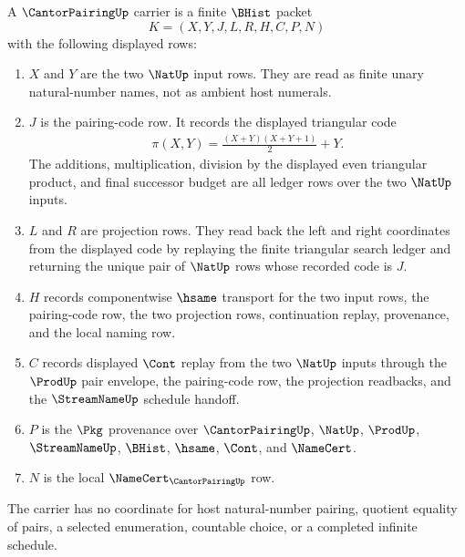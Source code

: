 \begin{definition}
\label{def:cantor-pairing-carrier}
A $\CantorPairingUp$ carrier is a finite $\BHist$ packet
$$
K=(X,Y,J,L,R,H,C,P,N)
$$
with the following displayed rows:
\begin{enumerate}
\item $X$ and $Y$ are the two $\NatUp$ input rows. They are read as finite unary natural-number names, not as ambient host numerals.
\item $J$ is the pairing-code row. It records the displayed triangular code
$$
\begin{aligned}
\pi(X,Y)=\frac{(X+Y)(X+Y+1)}{2}+Y .
\end{aligned}
$$
The additions, multiplication, division by the displayed even triangular product, and final successor budget are all ledger rows over the two $\NatUp$ inputs.
\item $L$ and $R$ are projection rows. They read back the left and right coordinates from the displayed code by replaying the finite triangular search ledger and returning the unique pair of $\NatUp$ rows whose recorded code is $J$.
\item $H$ records componentwise $\hsame$ transport for the two input rows, the pairing-code row, the two projection rows, continuation replay, provenance, and the local naming row.
\item $C$ records displayed $\Cont$ replay from the two $\NatUp$ inputs through the $\ProdUp$ pair envelope, the pairing-code row, the projection readbacks, and the $\StreamNameUp$ schedule handoff.
\item $P$ is the $\Pkg$ provenance over $\CantorPairingUp$, $\NatUp$, $\ProdUp$, $\StreamNameUp$, $\BHist$, $\hsame$, $\Cont$, and $\NameCert$.
\item $N$ is the local $\NameCert_{\CantorPairingUp}$ row.
\end{enumerate}
The carrier has no coordinate for host natural-number pairing, quotient equality of pairs, a selected enumeration, countable choice, or a completed infinite schedule.
\end{definition}

